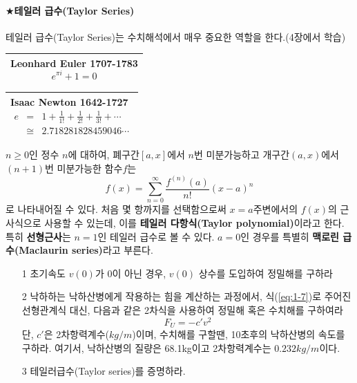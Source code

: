 \paragraph{$\bigstar$테일러 급수(Taylor Series)}
테일러 급수(Taylor Series)는 수치해석에서 매우 중요한 역할을 한다.(4장에서 학습)

\begin{tabular}[c]{|p{4.7cm}|}
\hline
\textbf{Leonhard Euler 1707-1783}
\begin{displaymath}
e^{\pi i} +1=0
\end{displaymath}
\\\hline
\end{tabular}

\begin{tabular}[c]{|p{4.7cm}|}
\hline
\textbf{Isaac Newton 1642-1727}
\begin{eqnarray*}
e&=&1+\frac{1}{1!}+\frac{1}{2!}+\frac{1}{3!}+\cdots \\
&\cong& 2.718281828459046 \cdots
\end{eqnarray*}
\\\hline
\end{tabular}

\begin{theorem}
$n\geq0$인 정수 $n$에 대하여, 폐구간$[a,x]$에서 $n$번 미분가능하고 개구간$(a,x)$에서 $(n+1)$번 미분가능한 함수$f$는
\begin{equation}
f(x)=\sum_{n=0}^{\infty}\frac{f^{(n)}(a)}{n!}(x-a)^{n}
\end{equation} 
로 나타내어질 수 있다. 처음 몇 항까지를 선택함으로써 $x=a$주변에서의 $f(x)$의 근사식으로 사용할 수 있는데, 이를 \textbf{테일러 다항식(Taylor polynomial)}이라고 한다. 특히 \textbf{선형근사}는 $n=1$인 테일러 급수로 볼 수 있다. $a=0$인 경우를 특별히 \textbf{맥로린 급수(Maclaurin series)}라고 부른다.
\end{theorem}


\begin{itemize}
\item[1] 초기속도 $v(0)$가 $0$이 아닌 경우, $v(0)$ 상수를 도입하여 정밀해를 구하라
\item[2] 낙하하는 낙하산병에게 작용하는 힘을 계산하는 과정에서, 식(\ref{eq:1-7})로 주어진 선형관계식 대신, 다음과 같은 2차식을 사용하여 정밀해 혹은 수치해를 구하여라
\begin{displaymath}
F_{U}=-c'v^2
\end{displaymath}
단, $c'$은 2차항력계수($kg/m$)이며, 수치해를 구할땐, 10초후의 낙하산병의 속도를 구하라. 여기서, 낙하산병의 질량은 68.1kg이고 2차항력계수는 $0.232kg/m$이다.
\item[3] 테일러급수(Taylor series)를 증명하라.
\end{itemize}